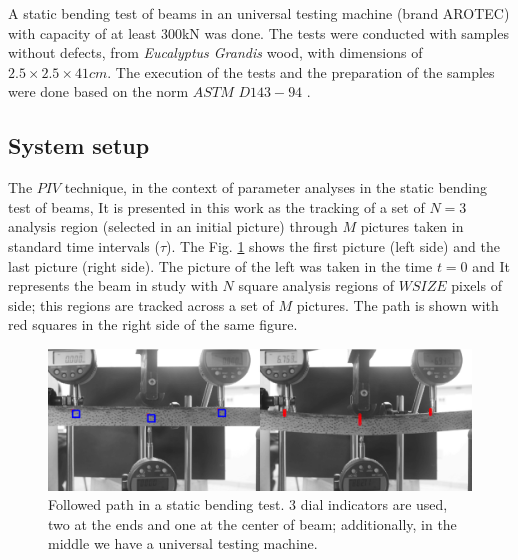 A static bending test of beams in an universal testing machine (brand AROTEC)
with capacity of at least 300kN was done. The tests were conducted with samples
without defects, from  \textit{Eucalyptus Grandis}  wood, with dimensions of
$2.5 \times 2.5 \times41 cm$. The execution of the tests and the preparation 
of the samples were done based on the norm $ASTM$ $D143-94$ 
\cite{AMERICANSOCIETY}.

\subsection{System setup}
\label{subsec:syssetup}
The $PIV$ technique, in the context of parameter analyses in the static bending test of beams,
It is presented in this work as the tracking of a set of $N=3$ analysis
region (selected in an initial picture) through $M$ pictures taken in standard time intervals ($\tau$).
The Fig. \ref{fig:pivwindow} shows the first picture (left side) 
and the last picture (right side). The picture of the left was taken in
the time $t=0$ and It represents the beam in study with 
$N$ square analysis regions of $WSIZE$ pixels of side; this regions are tracked
across a set of $M$ pictures. The path is shown with red squares in the right side of
the same figure.
\begin{figure}[H]
\centering
\includegraphics[width=\columnwidth]{numresult1.eps}
\caption{Followed path in a static bending test. 3 dial indicators are used,
two at the ends and one at the center of beam; additionally, in the middle we have a universal testing machine.}
\label{fig:pivwindow}
\end{figure}

